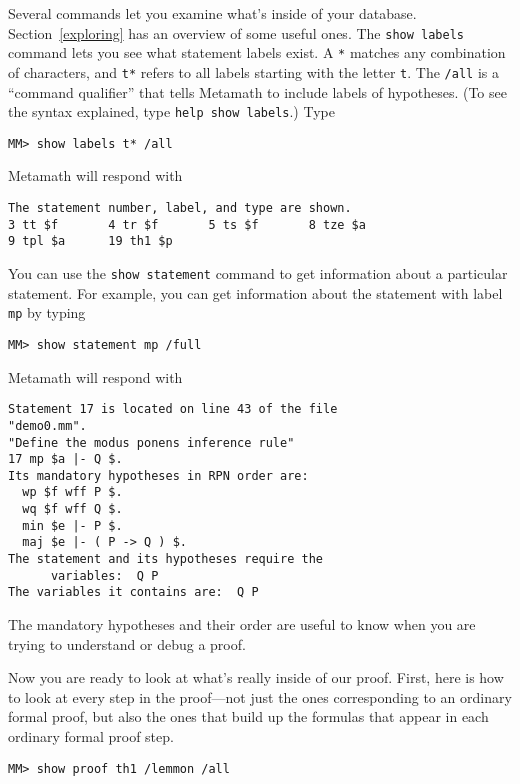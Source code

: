 Several commands let you examine what's inside of your database.
Section~\ref{exploring} has an overview of some useful ones.  The
\texttt{show labels} command lets you see what statement
labels exist.  A \texttt{*} matches any combination of
characters, and \texttt{t*} refers to all labels starting with the
letter \texttt{t}. The \texttt{/all}
is a ``command qualifier'' that tells Metamath
to include labels of hypotheses.  (To see the syntax explained, type
\texttt{help show labels}.)  Type
\begin{verbatim}
MM> show labels t* /all
\end{verbatim}
Metamath will respond with
\begin{verbatim}
The statement number, label, and type are shown.
3 tt $f       4 tr $f       5 ts $f       8 tze $a
9 tpl $a      19 th1 $p
\end{verbatim}

You can use the \texttt{show statement} command to get information about a
particular statement.
For example, you can get information about the statement with label \texttt{mp}
by typing
\begin{verbatim}
MM> show statement mp /full
\end{verbatim}
Metamath will respond with
\begin{verbatim}
Statement 17 is located on line 43 of the file
"demo0.mm".
"Define the modus ponens inference rule"
17 mp $a |- Q $.
Its mandatory hypotheses in RPN order are:
  wp $f wff P $.
  wq $f wff Q $.
  min $e |- P $.
  maj $e |- ( P -> Q ) $.
The statement and its hypotheses require the
      variables:  Q P
The variables it contains are:  Q P
\end{verbatim}
The mandatory hypotheses and their
order are
useful to know when you are trying to understand or debug a proof.

Now you are ready to look at what's really inside of our proof.  First, here is
how to look at every step in the proof---not just the ones corresponding to an
ordinary formal proof, but also the ones that build up the
formulas that appear in each ordinary formal proof step.
\begin{verbatim}
MM> show proof th1 /lemmon /all
\end{verbatim}

